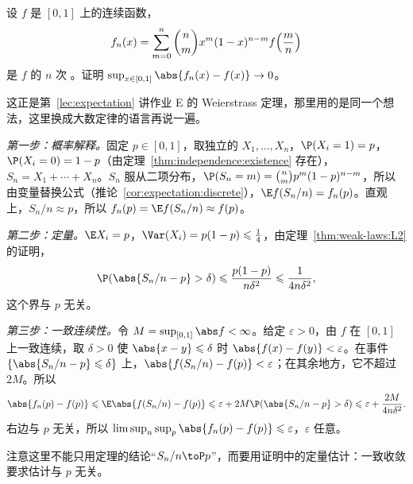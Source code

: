 \begin{workedexample}[多项式逼近]\label{we:weak-laws:bernstein}
设 $f$ 是 $[0,1]$ 上的连续函数，
\[
f_n(x)=\sum_{m=0}^n\binom nmx^m(1-x)^{n-m}f\Bigl(\frac mn\Bigr)
\]
是 $f$ 的 $n$ 次 。证明 $\sup_{x\in[0,1]}\abs{f_n(x)-f(x)}\to0$。
\end{workedexample}
\begin{solution}
这正是第~\ref{lec:expectation} 讲作业 E 的 Weierstrass 定理，那里用的是同一个想法，这里换成大数定律的语言再说一遍。

\emph{第一步：概率解释。}固定 $p\in[0,1]$，取独立的 $X_1,\dots,X_n$，$\P(X_i=1)=p$，$\P(X_i=0)=1-p$（由定理~\ref{thm:independence:existence} 存在），$S_n=X_1+\cdots+X_n$。$S_n$ 服从二项分布，$\P(S_n=m)=\binom nmp^m(1-p)^{n-m}$，所以由变量替换公式（推论~\ref{cor:expectation:discrete}），$\E f(S_n/n)=f_n(p)$。直观上，$S_n/n\approx p$，所以 $f_n(p)=\E f(S_n/n)\approx f(p)$。

\emph{第二步：定量。}$\E X_i=p$，$\Var(X_i)=p(1-p)\leqslant\frac14$，由定理~\ref{thm:weak-laws:L2} 的证明，
\[
\P(\abs{S_n/n-p}>\delta)\leqslant\frac{p(1-p)}{n\delta^2}\leqslant\frac1{4n\delta^2},
\]
这个界与 $p$ 无关。

\emph{第三步：一致连续性。}令 $M=\sup_{[0,1]}\abs f<\infty$。给定 $\varepsilon>0$，由 $f$ 在 $[0,1]$ 上一致连续，取 $\delta>0$ 使 $\abs{x-y}\leqslant\delta$ 时 $\abs{f(x)-f(y)}<\varepsilon$。在事件 $\{\abs{S_n/n-p}\leqslant\delta\}$ 上，$\abs{f(S_n/n)-f(p)}<\varepsilon$；在其余地方，它不超过 $2M$。所以
\[
\abs{f_n(p)-f(p)}\leqslant \E\abs{f(S_n/n)-f(p)}\leqslant\varepsilon+2M\P(\abs{S_n/n-p}>\delta)\leqslant\varepsilon+\frac{2M}{4n\delta^2}.
\]
右边与 $p$ 无关，所以 $\limsup_n\sup_p\abs{f_n(p)-f(p)}\leqslant\varepsilon$，$\varepsilon$ 任意。

注意这里不能只用定理的结论“$S_n/n\toP p$”，而要用证明中的定量估计：一致收敛要求估计与 $p$ 无关。
\end{solution}

